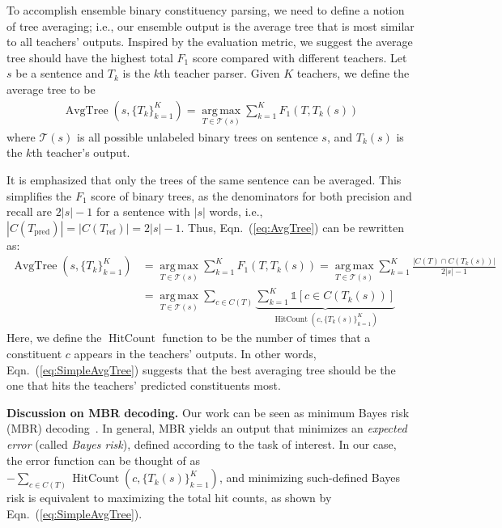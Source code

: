 \documentclass{article}
\DeclareMathOperator*{\argmax}{arg\,max}
\begin{document}
To accomplish ensemble binary constituency parsing, we need to define a notion of tree averaging; i.e., our ensemble output is the average tree that is most similar to all teachers' outputs. Inspired by the evaluation metric, we suggest the average tree should have the highest total $F_1$ score compared with different teachers. Let $s$ be a sentence and $T_k$ is the $k$th teacher parser. Given $K$ teachers, we define the average tree to be
\begin{align}
\label{eq:AvgTree}
\operatorname{AvgTree}(s, \{T_k\}_{k=1}^K) = \argmax\limits_{T \in \mathcal T(s)} \sum_{k=1}^K F_1(T, T_k(s))
\end{align}
where $\mathcal T(s)$ is all possible unlabeled binary trees on sentence $s$, and $T_k(s)$ is the $k$th teacher's output. 

It is emphasized that only the trees of the same sentence can be averaged. This simplifies the $F_1$ score of binary trees, as the denominators for both precision and recall are $2|s|-1$ for a sentence with $|s|$ words, i.e., $|C(T_{\text{pred}})| = |C(T_{\text{ref}})| = 2|s|-1$. Thus, Eqn.~(\ref{eq:AvgTree}) can be rewritten as:
\begin{align}
\operatorname{AvgTree}(s, \{T_k\}_{k=1}^K) &= \argmax\limits_{T \in \mathcal T(s)} \sum_{k=1}^K F_1(T, T_k(s)) = \argmax\limits_{T \in \mathcal T(s)} \sum_{k=1}^K \frac{|C(T) \cap C(T_k(s))|}{2|s|-1} \\
\label{eq:SimpleAvgTree}
&= \argmax\limits_{T \in \mathcal T(s)} \sum_{c \in C(T)} \underbrace{\sum_{k=1}^K \mathds{1}[c \in C(T_k(s))]}_{\operatorname{HitCount}(c, \{T_k(s)\}_{k=1}^K)}
\end{align}
Here, we define the $\operatorname{HitCount}$ function to be the number of times that a constituent $c$ appears in the teachers’ outputs. In other words, Eqn.~(\ref{eq:SimpleAvgTree}) suggests that the best averaging tree should be the one that hits the teachers' predicted constituents most.

\textbf{Discussion on MBR decoding.}
\label{discussion:SelectiveMBR}
Our work can be seen as minimum Bayes risk (MBR) decoding~\citep{MBRbook}. In general, MBR yields an output that minimizes an \textit{expected error} (called \textit{Bayes risk}), defined according to the task of interest. In our case, the error function can be thought of as $-\sum_{c\in C(T)}\operatorname{HitCount}(c, \{T_k(s)\}_{k=1}^K)$, and minimizing such-defined Bayes risk is equivalent to maximizing the total hit counts, as shown by Eqn.~(\ref{eq:SimpleAvgTree}).
\end{document}
